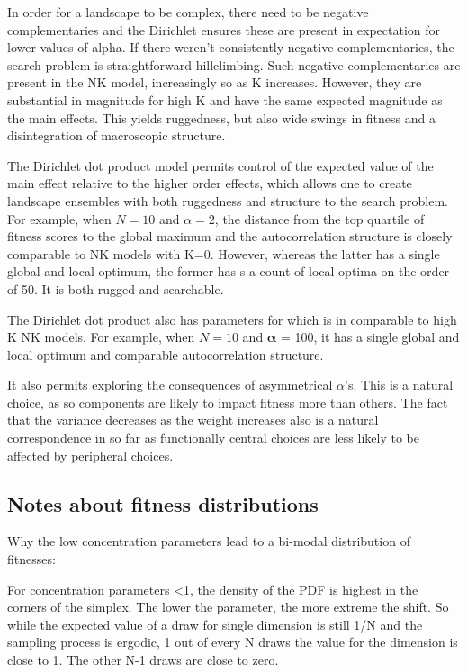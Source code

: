 \documentclass[12pt]{article}
\begin{document}
In order for a landscape to be complex, there need to be negative complementaries and the Dirichlet ensures these are present in expectation for lower values of alpha. If there weren't consistently negative complementaries, the search problem is straightforward hillclimbing. Such negative complementaries are present in the NK model, increasingly so as K increases. However, they are substantial in magnitude for high K and have the same expected magnitude as the main effects. This yields ruggedness, but also wide swings in fitness and a disintegration of macroscopic structure.

 The Dirichlet dot product model permits control of the expected value of the main effect relative to the higher order effects, which allows one to create landscape ensembles with both ruggedness and structure to the search problem. For example, when $N=10$ and $\alpha = 2$, the distance from the top quartile of fitness scores to the global maximum and the autocorrelation structure is closely comparable to NK models with K=0. However, whereas the latter has a single global and local optimum, the former has s a count of local optima on the order of 50. It is both rugged and searchable.

The Dirichlet dot product also has parameters for which is in comparable to high K NK models. For example, when $N=10$ and $\boldsymbol\alpha$ = 100, it has a single global and local optimum and comparable autocorrelation structure.

It also permits exploring the consequences of asymmetrical $\alpha$'s. This is a natural choice, as so components are likely to impact fitness more than others. The fact that the variance decreases as the weight increases also is a natural correspondence in so far as functionally central choices are less likely to be affected by peripheral choices.

\subsection*{Notes about fitness distributions}
Why the low concentration parameters lead to a bi-modal distribution of fitnesses:

For concentration parameters <1, the density of the PDF is highest in the corners of the simplex. The lower the parameter, the more extreme the shift. So while the expected value of a draw for single dimension is still 1/N and the sampling process is ergodic, 1 out of every N draws the value for the dimension is close to 1. The other N-1 draws are close to zero.
\end{document}
